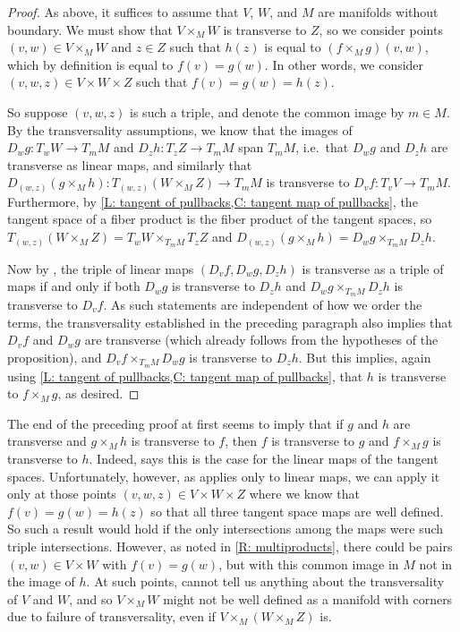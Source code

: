 \begin{proof}
	As above, it suffices to assume that $V$, $W$, and $M$ are manifolds without boundary. We must show that $V \times_MW$ is transverse to $Z$, so we consider points $(v,w) \in V \times_M W$ and $z \in Z$ such that $h(z)$ is equal to $(f \times_Mg)(v,w)$, which by definition is equal to $f(v) = g(w)$. In other words, we consider $(v,w,z) \in V \times W \times Z$ such that $f(v) = g(w) = h(z)$.

	So suppose $(v,w,z)$ is such a triple, and denote the common image by $m \in M$. By the transversality assumptions, we know that the images of $D_wg \colon T_wW \to T_mM$ and $D_z h \colon T_zZ \to T_mM$ span $T_mM$, i.e.\ that $D_wg$ and $D_zh$ are transverse as linear maps, and similarly that $D_{(w,z)}(g \times_M h) \colon T_{(w,z)}(W \times_M Z) \to T_mM$ is transverse to $D_vf \colon T_vV \to T_mM$. Furthermore, by \cref{L: tangent of pullbacks,C: tangent map of pullbacks}, the tangent space of a fiber product is the fiber product of the tangent spaces, so $T_{(w,z)}(W \times_M Z) = T_wW \times_{T_mM}T_zZ$ and $D_{(w,z)}(g \times_M h) = D_wg \times_{T_mM}D_zh$.

	Now by \cite[Propositions~4-9]{RamBas09}, the triple of linear maps $(D_vf,D_wg,D_zh)$ is transverse as a triple of maps if and only if both $D_wg$ is transverse to $D_zh$ and $D_wg \times_{T_mM}D_zh$ is transverse to $D_vf$. As such statements are independent of how we order the terms, the transversality established in the preceding paragraph also implies that $D_vf$ and $D_wg$ are transverse (which already follows from the hypotheses of the proposition), and $D_vf \times_{T_mM}D_wg$ is transverse to $D_zh$. But this implies, again using \cref{L: tangent of pullbacks,C: tangent map of pullbacks}, that $h$ is transverse to $f \times_Mg$, as desired.
\end{proof}

\begin{remark}
	The end of the preceding proof at first seems to imply that if $g$ and $h$ are transverse and $g \times_M h$ is transverse to $f$, then $f$ is transverse to $g$ and $f \times_Mg$ is transverse to $h$. Indeed, \cite[Propositions~4-9]{RamBas09} says this is the case for the linear maps of the tangent spaces. Unfortunately, however, as \cite[Propositions~4-9]{RamBas09} applies only to linear maps, we can apply it only at those points $(v,w,z) \in V \times W \times Z$ where we know that $f(v) = g(w) = h(z)$ so that all three tangent space maps are well defined. So such a result would hold if the only intersections among the maps were such triple intersections. However, as noted in \cref{R: multiproducts}, there could be pairs $(v,w) \in V \times W$ with $f(v) = g(w)$, but with this common image in $M$ not in the image of $h$. At such points, \cite[Propositions~4-9]{RamBas09} cannot tell us anything about the transversality of $V$ and $W$, and so $V \times_MW$ might not be well defined as a manifold with corners due to failure of transversality, even if $V \times_M (W \times_M Z)$ is.
\end{remark}
